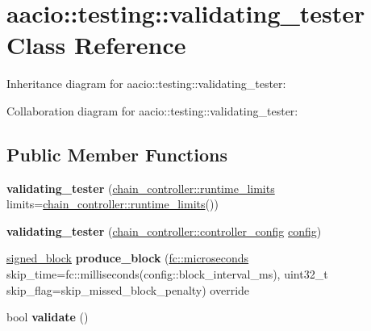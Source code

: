 \hypertarget{classaacio_1_1testing_1_1validating__tester}{}\section{aacio\+:\+:testing\+:\+:validating\+\_\+tester Class Reference}
\label{classaacio_1_1testing_1_1validating__tester}


Inheritance diagram for aacio\+:\+:testing\+:\+:validating\+\_\+tester\+:


Collaboration diagram for aacio\+:\+:testing\+:\+:validating\+\_\+tester\+:
\subsection*{Public Member Functions}
\begin{DoxyCompactItemize}
\item 
\mbox{\label{classaacio_1_1testing_1_1validating__tester_a782ad104ce775d461195648f8e26ac7f}} 
{\bfseries validating\+\_\+tester} (\mbox{\hyperlink{structaacio_1_1chain_1_1chain__controller_1_1runtime__limits}{chain\+\_\+controller\+::runtime\+\_\+limits}} limits=\mbox{\hyperlink{structaacio_1_1chain_1_1chain__controller_1_1runtime__limits}{chain\+\_\+controller\+::runtime\+\_\+limits}}())
\item 
\mbox{\label{classaacio_1_1testing_1_1validating__tester_afcbf52bf7e0af612fb65d596dbd4fc77}} 
{\bfseries validating\+\_\+tester} (\mbox{\hyperlink{structaacio_1_1chain_1_1chain__controller_1_1controller__config}{chain\+\_\+controller\+::controller\+\_\+config}} \mbox{\hyperlink{classconfig}{config}})
\item 
\mbox{\label{classaacio_1_1testing_1_1validating__tester_a0c1abff307c734f0f0706606707768ad}} 
\mbox{\hyperlink{structaacio_1_1chain_1_1signed__block}{signed\+\_\+block}} {\bfseries produce\+\_\+block} (\mbox{\hyperlink{classfc_1_1microseconds}{fc\+::microseconds}} skip\+\_\+time=fc\+::milliseconds(config\+::block\+\_\+interval\+\_\+ms), uint32\+\_\+t skip\+\_\+flag=skip\+\_\+missed\+\_\+block\+\_\+penalty) override
\item 
\mbox{\label{classaacio_1_1testing_1_1validating__tester_acff4f2d2954d5d3d8cd032c02ce3c6bc}} 
bool {\bfseries validate} ()
\end{DoxyCompactItemize}
